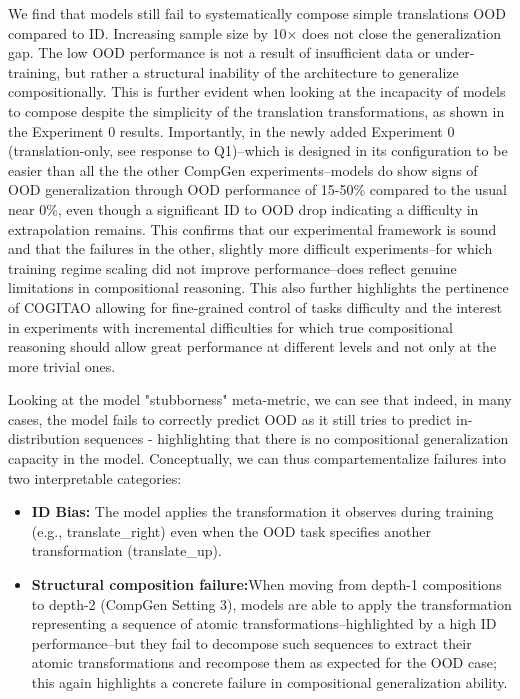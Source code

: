 We find that models still fail to systematically compose simple translations OOD compared to ID. Increasing sample size by 10× does not close the generalization gap. The low OOD performance is not a result of insufficient data or under-training, but rather a structural inability of the architecture to generalize compositionally. This is further evident when looking at the incapacity of models to compose despite the simplicity of the translation transformations, as shown in the Experiment 0 results. Importantly, in the newly added Experiment 0 (translation-only, see response to Q1)--which is designed in its configuration to be easier than all the the other CompGen experiments--models do show signs of OOD generalization through OOD performance of 15-50\% compared to the usual near 0\%, even though a significant ID to OOD drop indicating a difficulty in extrapolation remains. This confirms that our experimental framework is sound and that the failures in the other, slightly more difficult experiments--for which training regime scaling did not improve performance--does reflect genuine limitations in compositional reasoning. This also further highlights the pertinence of COGITAO allowing for fine-grained control of tasks difficulty and the interest in experiments with incremental difficulties for which true compositional reasoning should allow great performance at different levels and not only at the more trivial ones.

Looking at the model "stubborness" meta-metric, we can see that indeed, in many cases, the model fails to correctly predict OOD as it still tries to predict in-distribution sequences - highlighting that there is no compositional generalization capacity in the model. Conceptually, we can thus compartementalize failures into two interpretable categories:

\begin{itemize}
    \item \textbf{ID Bias:} The model applies the transformation it observes during training (e.g., translate\_right) even when the OOD task specifies another transformation (translate\_up).
    \item \textbf{Structural composition failure:}When moving from depth-1 compositions to depth-2 (CompGen Setting 3), models are able to apply the transformation representing a sequence of atomic transformations–highlighted by a high ID performance–but they fail to decompose such sequences to extract their atomic transformations and recompose them as expected for the OOD case; this again highlights a concrete failure in compositional generalization ability.
\end{itemize}

